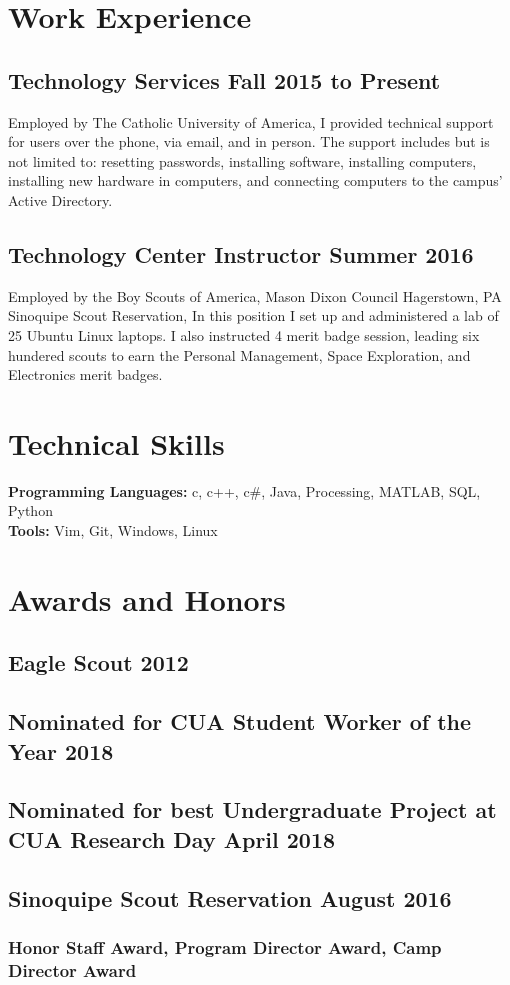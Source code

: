 \documentclass{article}
\begin{document}
\section{Work Experience}
\subsection{Technology Services \hfill Fall 2015 to Present}
Employed by The Catholic University of America,
I provided technical support for users over the phone, via email, and in person.
The support includes but is not limited to:
resetting passwords,
installing software,
installing computers,
installing new hardware in computers,
and
connecting computers to the campus' Active Directory.

\subsection{Technology Center Instructor \hfill Summer 2016}
Employed by the Boy Scouts of America, Mason Dixon Council Hagerstown, PA Sinoquipe Scout Reservation,
In this position I set up and administered a lab of 25 Ubuntu Linux laptops.
I also instructed 4 merit badge session, leading six hundered scouts to earn the
Personal Management,
Space Exploration,
and
Electronics
merit badges.

\section{Technical Skills}
\textbf{Programming Languages:}
c,
c++,
c\#,
Java,
Processing,
MATLAB,
SQL,
Python \\
\textbf{Tools:}
Vim,
Git,
Windows,
Linux

\section{Awards and Honors}
\subsection{Eagle Scout \hfill 2012}
\subsection{Nominated for CUA Student Worker of the Year \hfill 2018}
\subsection{Nominated for best Undergraduate Project at CUA Research Day \hfill April 2018}
\subsection{Sinoquipe Scout Reservation \hfill August 2016}
\subsubsection{Honor Staff Award, Program Director Award, Camp Director Award}
\end{document}
